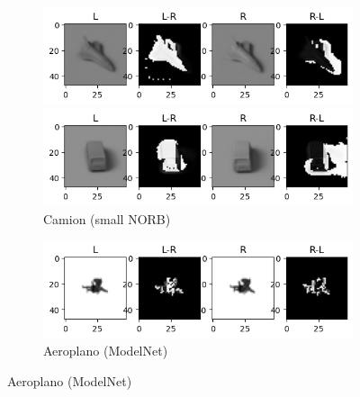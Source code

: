 \documentclass[italian,12pt,a4paper,oneside,final]{report}
\begin{document}
\begin{figure}[!ht]
	\centering
	\begin{subfigure}{0.4\textwidth}
		\begin{subcaptionblock}{1.2\textwidth}
			\centering
			\includegraphics[width=1\linewidth]{smallnorb_augment_airplane.png}
			\caption{Aeroplano (small NORB)}
			\label{fig:smallnorb_augment_airplane}
		\end{subcaptionblock}%
		\hfill
		\begin{subcaptionblock}{1.2\textwidth}
			\centering
			\includegraphics[width=1\linewidth]{smallnorb_augment_truck.png}
			\caption{Camion (small NORB)}
			\label{fig:smallnorb_augment_truck}
		\end{subcaptionblock}%
	\end{subfigure}
	\hfill
	\begin{subfigure}{0.4\textwidth}
		\begin{subcaptionblock}{1.2\textwidth}
			\centering
			\includegraphics[width=1\linewidth]{modelnet_augment_airplane.png}
			\caption{Aeroplano (ModelNet)}
			\label{fig:modelnet_augment_airplane}
		\end{subcaptionblock}%
		\hfill
		\begin{subcaptionblock}{1.2\textwidth}

\end{subcaptionblock}
\end{subfigure}
\end{figure}
\end{document}
